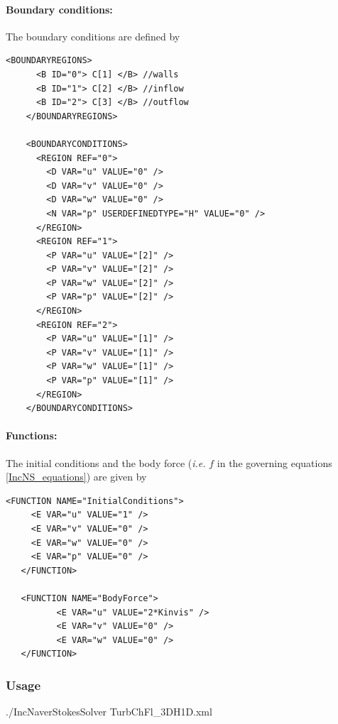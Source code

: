 \paragraph{Boundary conditions:~} The boundary conditions are defined by
\begin{lstlisting}[style=XMLStyle]
    <BOUNDARYREGIONS>
      <B ID="0"> C[1] </B> //walls
      <B ID="1"> C[2] </B> //inflow
      <B ID="2"> C[3] </B> //outflow
    </BOUNDARYREGIONS>

    <BOUNDARYCONDITIONS>
      <REGION REF="0">
        <D VAR="u" VALUE="0" />
        <D VAR="v" VALUE="0" />
        <D VAR="w" VALUE="0" />
        <N VAR="p" USERDEFINEDTYPE="H" VALUE="0" />  
      </REGION>
      <REGION REF="1">
        <P VAR="u" VALUE="[2]" />
        <P VAR="v" VALUE="[2]" />
        <P VAR="w" VALUE="[2]" />
        <P VAR="p" VALUE="[2]" />
      </REGION>
      <REGION REF="2">
        <P VAR="u" VALUE="[1]" />
        <P VAR="v" VALUE="[1]" />
        <P VAR="w" VALUE="[1]" />
        <P VAR="p" VALUE="[1]" />
      </REGION>
    </BOUNDARYCONDITIONS>
\end{lstlisting}

\paragraph{Functions:~} The initial conditions and the body force (\textit{i.e.} $f$ in the governing equations \ref{IncNS_equations}) are given by
\begin{lstlisting}[style=XMLStyle]
   <FUNCTION NAME="InitialConditions">
     <E VAR="u" VALUE="1" />
     <E VAR="v" VALUE="0" />
     <E VAR="w" VALUE="0" />
     <E VAR="p" VALUE="0" />
   </FUNCTION>
   
   <FUNCTION NAME="BodyForce">
          <E VAR="u" VALUE="2*Kinvis" />
          <E VAR="v" VALUE="0" />
          <E VAR="w" VALUE="0" />
   </FUNCTION>
\end{lstlisting}

\subsubsection{Usage} ./IncNaverStokesSolver TurbChFl\_3DH1D.xml 

